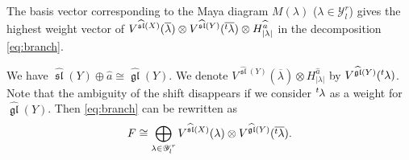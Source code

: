 \documentclass[pdftex]{sigma}
\theoremstyle{definition}
\numberwithin{equation}{section}
\newcommand{\lsp}[2]{{\mskip-.3mu}{}^{#1}\mskip-1mu{#2}}
\newcommand{\algsl}{\operatorname{\mathfrak{sl}}} %
\newcommand{\gl}{\operatorname{\mathfrak{gl}}}
\begin{document}
The basis vector corresponding to the Maya diagram $M(\lambda)$
($\lambda\in\mathscr Y^r_l$) gives the highest weight vector of
$V^{\widehat{\algsl}(X)}(\overline\lambda)\otimes
V^{\widehat{\algsl}(Y)}(\overline{\lsp{t}\lambda}) \otimes
H^{\widehat{a}}_{|\lambda|}$ in the decomposition \eqref{eq:branch}.

We have $\widehat{\algsl}(Y)\oplus\widehat{a} \cong \widehat{\gl}(Y)$.
We denote $V^{\widehat{\algsl}(Y)}(\overline{\lambda}) \otimes
H^{\widehat{a}}_{|\lambda|}$ by
$V^{\widehat{\gl}(Y)}(\lsp{t}\lambda)$. Note that the ambiguity of the
shift disappears if we consider $\lsp{t}\lambda$ as a weight for
$\widehat{\gl}(Y)$.
%
Then \eqref{eq:branch} can be rewritten as
\begin{equation}
  \label{eq:branch'}
   F \cong
   \bigoplus_{\substack{\lambda\in\mathscr Y^r_l}}
   V^{\widehat{\algsl}(X)}(\lambda)
   \otimes V^{\widehat{\gl}(Y)}(\overline{\lsp{t}\lambda}).
\end{equation}
\end{document}
